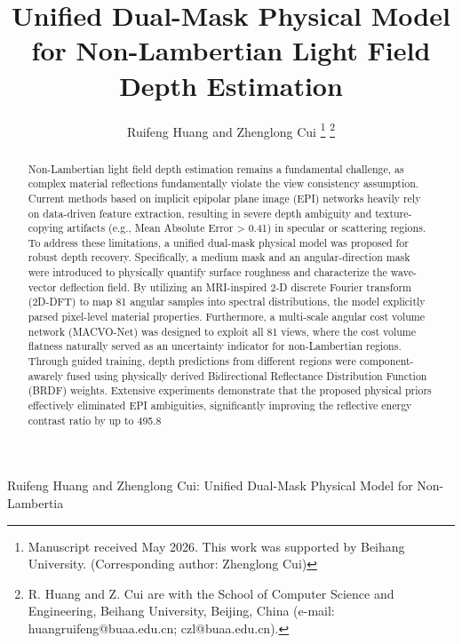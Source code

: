 \documentclass[lettersize,journal]{IEEEtran}
\begin{document}
\title{Unified Dual-Mask Physical Model for Non-Lambertian Light Field Depth Estimation}

\author{Ruifeng Huang and Zhenglong Cui
\thanks{Manuscript received May 2026. This work was supported by Beihang University. (Corresponding author: Zhenglong Cui)}
\thanks{R. Huang and Z. Cui are with the School of Computer Science and Engineering, Beihang University, Beijing, China (e-mail: huangruifeng@buaa.edu.cn; czl@buaa.edu.cn).}}

%
{Ruifeng Huang and Zhenglong Cui: Unified Dual-Mask Physical Model for Non-Lambertia}

\maketitle

\begin{abstract}
Non-Lambertian light field depth estimation remains a fundamental challenge, as complex material reflections fundamentally violate the view consistency assumption. Current methods based on implicit epipolar plane image (EPI) networks heavily rely on data-driven feature extraction, resulting in severe depth ambiguity and texture-copying artifacts (e.g., Mean Absolute Error > 0.41) in specular or scattering regions. To address these limitations, a unified dual-mask physical model was proposed for robust depth recovery. Specifically, a medium mask and an angular-direction mask were introduced to physically quantify surface roughness and characterize the wave-vector deflection field. By utilizing an MRI-inspired 2-D discrete Fourier transform (2D-DFT) to map 81 angular samples into spectral distributions, the model explicitly parsed pixel-level material properties. Furthermore, a multi-scale angular cost volume network (MACVO-Net) was designed to exploit all 81 views, where the cost volume flatness naturally served as an uncertainty indicator for non-Lambertian regions. Through guided training, depth predictions from different regions were component-awarely fused using physically derived Bidirectional Reflectance Distribution Function (BRDF) weights. Extensive experiments demonstrate that the proposed physical priors effectively eliminated EPI ambiguities, significantly improving the reflective energy contrast ratio by up to 495.8%
\end{abstract}
\end{document}
